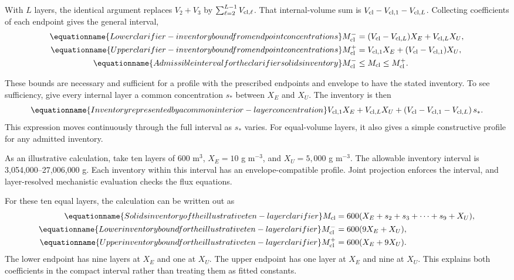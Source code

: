 With $L$ layers, the identical argument replaces $V_2+V_3$ by $\sum_{\ell=2}^{L-1}V_{{\rm cl},\ell}$. That internal-volume sum is $V_{\rm cl}-V_{{\rm cl},1}-V_{{\rm cl},L}$. Collecting coefficients of each endpoint gives the general interval,
\begin{align}
\equationname{Lower clarifier-inventory bound from endpoint concentrations}
M_{\rm cl}^{-}&=(V_{\rm cl}-V_{{\rm cl},L})X_E+V_{{\rm cl},L}X_U,\\
\equationname{Upper clarifier-inventory bound from endpoint concentrations}
M_{\rm cl}^{+}&=V_{{\rm cl},1}X_E+(V_{\rm cl}-V_{{\rm cl},1})X_U,\\
\equationname{Admissible interval for the clarifier solids inventory}
M_{\rm cl}^{-}&\le M_{\rm cl}\le M_{\rm cl}^{+}.
\label{eq:plant_inventory_bounds}
\end{align}

These bounds are necessary and sufficient for a profile with the prescribed endpoints and envelope to have the stated inventory. To see sufficiency, give every internal layer a common concentration $s_*$ between $X_E$ and $X_U$. The inventory is then
\begin{equation}
\equationname{Inventory represented by a common interior-layer concentration}
V_{{\rm cl},1}X_E+V_{{\rm cl},L}X_U
+\left(V_{\rm cl}-V_{{\rm cl},1}-V_{{\rm cl},L}\right)s_*.
\end{equation}
This expression moves continuously through the full interval as $s_*$ varies. For equal-volume layers, it also gives a simple constructive profile for any admitted inventory.

As an illustrative calculation, take ten layers of 600 m$^3$, $X_E=10$ g m$^{-3}$, and $X_U=5{,}000$ g m$^{-3}$. The allowable inventory interval is 3{,}054{,}000--27{,}006{,}000 g. Each inventory within this interval has an envelope-compatible profile. Joint projection enforces the interval, and layer-resolved mechanistic evaluation checks the flux equations.

For these ten equal layers, the calculation can be written out as
\begin{align}
\equationname{Solids inventory of the illustrative ten-layer clarifier}
M_{\rm cl}&=600(X_E+s_2+s_3+\cdots+s_9+X_U),\\
\equationname{Lower inventory bound for the illustrative ten-layer clarifier}
M_{\rm cl}^{-}&=600(9X_E+X_U),\\
\equationname{Upper inventory bound for the illustrative ten-layer clarifier}
M_{\rm cl}^{+}&=600(X_E+9X_U).
\end{align}
The lower endpoint has nine layers at $X_E$ and one at $X_U$. The upper endpoint has one layer at $X_E$ and nine at $X_U$. This explains both coefficients in the compact interval rather than treating them as fitted constants.

